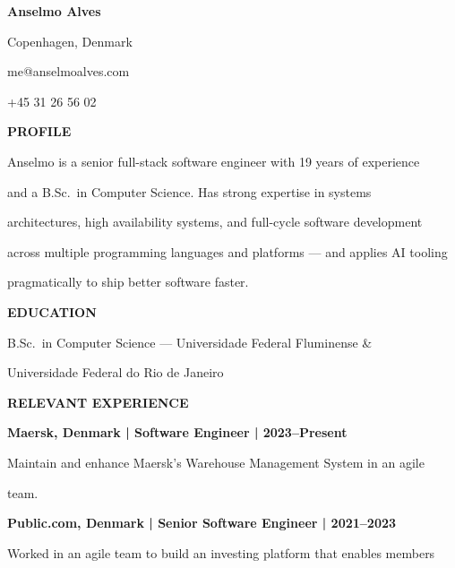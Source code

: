 \documentclass[a4paper]{article}
\begin{document}
\begin{flushright}
    {\fontsize{22pt}{20pt}\selectfont\textbf{Anselmo Alves}}\par
    \vspace{19pt}%
    \textcolor{darkblack}{Copenhagen, Denmark}\par
    \textcolor{darkblack}{me@anselmoalves.com}\par
    \textcolor{darkblack}{+45 31 26 56 02}\par
\end{flushright}
\vspace{31pt}
\noindent\textbf{PROFILE}\par
\vspace{20pt}
\noindent Anselmo is a senior full-stack software engineer with 19 years of experience\par
\noindent and a B.Sc.\ in Computer Science. Has strong expertise in systems\par
\noindent architectures, high availability systems, and full-cycle software development\par
\noindent across multiple programming languages and platforms — and applies AI tooling \par
\noindent pragmatically to ship better software faster.\par
\vspace{40pt}
\noindent\textbf{EDUCATION}\par
\vspace{20pt}
\noindent B.Sc.\ in Computer Science — Universidade Federal Fluminense \&\par
\noindent Universidade Federal do Rio de Janeiro\par
\vspace{40pt}
\noindent\textbf{RELEVANT EXPERIENCE}\par
\vspace{20pt}
\noindent\textbf{Maersk, Denmark | Software Engineer | 2023–Present}\par
\noindent Maintain and enhance Maersk's Warehouse Management System in an agile\par
\noindent team.\par
\vspace{20pt}
\noindent\textbf{Public.com, Denmark | Senior Software Engineer | 2021–2023}\par
\noindent Worked in an agile team to build an investing platform that enables members\par
\end{document}
